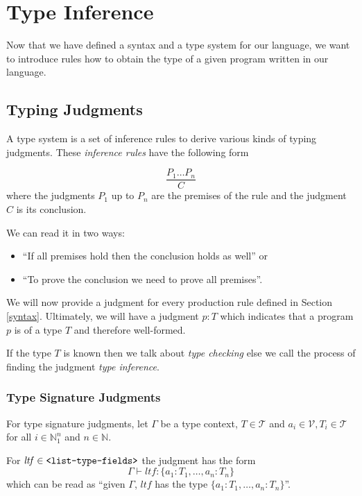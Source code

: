 \documentclass[]{scrbook}
\providecommand{\tightlist}{%
  \setlength{\itemsep}{0pt}\setlength{\parskip}{0pt}}
\newcommand{\mf}[1]{\text{\texttt{#1}}}
\theoremstyle{definition}
\theoremstyle{definition}
\theoremstyle{definition}
\theoremstyle{remark}
\begin{document}
\section{Type Inference}\label{type-inference}

Now that we have defined a syntax and a type system for our language, we
want to introduce rules how to obtain the type of a given program
written in our language.

\subsection{Typing Judgments}\label{typing-judgments}

A type system is a set of inference rules to derive various kinds of
typing judgments. These \emph{inference rules} have the following form

\[
\frac
{P_1 \dots P_n}
{C}
\] where the judgments \(P_1\) up to \(P_n\) are the premises of the
rule and the judgment \(C\) is its conclusion.

We can read it in two ways:

\begin{itemize}
\tightlist
\item
  \enquote{If all premises hold then the conclusion holds as well} or
\item
  \enquote{To prove the conclusion we need to prove all premises}.
\end{itemize}

We will now provide a judgment for every production rule defined in
Section \ref{syntax}. Ultimately, we will have a judgment \(p:T\) which
indicates that a program \(p\) is of a type \(T\) and therefore
well-formed.

If the type \(T\) is known then we talk about \emph{type checking} else
we call the process of finding the judgment \emph{type inference}.

\subsubsection*{Type Signature
Judgments}\label{type-signature-judgments}

For type signature judgments, let \(\Gamma\) be a type context,
\(T\in\mathcal{T}\) and \(a_i\in\mathcal{V},T_i\in\mathcal{T}\) for all
\(i\in\mathbb{N}_1^n\) and \(n\in\mathbb{N}\).

For \(\mathit{ltf}\in\mf{<list-type-fields>}\) the judgment has the form
\[\Gamma\vdash \mathit{ltf}:\{a_1:T_1,\dots,a_n:T_n\}\] which can be
read as \enquote{given \(\Gamma\), \(ltf\) has the type
\(\{a_1:T_1,\dots,a_n:T_n\}\)}.
\end{document}
